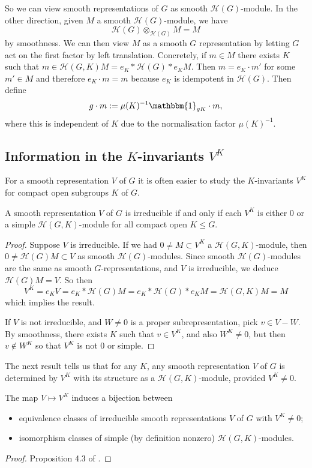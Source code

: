So we can view smooth representations of $G$ as smooth $\mathcal H(G)$-module. In the other direction, given $M$ a smooth $\mathcal H(G)$-module, we have $$\mathcal H(G) \otimes_{\mathcal H(G)} M = M$$ by smoothness. We can then view $M$ as a smooth $G$ representation by letting $G$ act on the first factor by left translation. Concretely, if $m \in M$ there exists $K$ such that $m \in \mathcal H(G,K)M = e_K*\mathcal H(G)*e_K M$. Then $m = e_K \cdot m'$ for some $m' \in M$ and therefore $e_K \cdot m = m$ because $e_K$ is idempotent in $\mathcal H(G)$. Then define $$g \cdot m := \mu(K)^{-1} \mathbbm{1}_{gK} \cdot m,$$ where this is independent of $K$ due to the normalisation factor $\mu(K)^{-1}$.

\subsection{Information in the \texorpdfstring{$K$}{TEXT}-invariants \texorpdfstring{$V^K$}{TEXT}}
For a smooth representation $V$ of $G$ it is often easier to study the $K$-invariants $V^K$ for compact open subgroups $K$ of $G$.



\begin{lemma}\label{K inv}
    A smooth representation $V$ of $G$ is irreducible if and only if each $V^K$ is either 0 or a simple $\mathcal H(G,K)$-module for all compact open $K \leq G$.
\end{lemma}
\begin{proof}
    Suppose $V$ is irreducible. If we had $0 \neq M \subset V^K$ a $\mathcal H(G,K)$-module, then $0 \neq \mathcal H(G) M \subset V$ as smooth $\mathcal H(G)$-modules. Since smooth $\mathcal H(G)$-modules are the same as smooth $G$-representations, and $V$ is irreducible, we deduce $\mathcal H(G)M = V$. So then $$V^K = e_K V = e_K * \mathcal H(G)M = e_K * \mathcal H(G) *e_K M = \mathcal H(G,K)M=M$$ which implies the result.

    If $V$ is not irreducible, and $W \neq 0$ is a proper subrepresentation, pick $v \in V-W$. By smoothness, there exists $K$ such that $v \in V^K$, and also $W^K \neq 0$, but then $v \not\in W^K$ so that $V^K$ is not 0 or simple.
\end{proof}

The next result tells us that for any $K$, any smooth representation $V$ of $G$ is determined by $V^K$ with its structure as a $\mathcal H(G,K)$-module, provided $V^K \neq 0$.

\begin{prop}\label{K bij}
    The map $V \mapsto V^K$ induces a bijection between
    \begin{itemize}
        \item equivalence classes of irreducible smooth representations $V$ of $G$ with $V^K \neq 0$;
        \item isomorphism classes of simple (by definition nonzero) $\mathcal H(G,K)$-modules.
    \end{itemize}
\end{prop}
\begin{proof}
    Proposition 4.3 of \cite{BH1}.
\end{proof}

